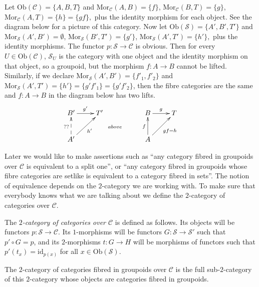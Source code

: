 \begin{example}
Let $ \text{Ob}(\mathcal{C}) = \{A,B,T\}$ and 
$\text{Mor}_\mathcal{C}(A,B) = \{f\}$, $\text{Mor}_\mathcal{C}(B,T) = \{g\}$,
$\text{Mor}_\mathcal{C}(A,T) = \{h\} = \{gf\},$ plus the identity morphism for 
each object. See the diagram below for a picture of this category. Now let 
$\text{Ob}(\mathcal{S}) = \{A',B',T'\}$ and 
$\text{Mor}_\mathcal{S}(A',B') = \emptyset$,  
$\text{Mor}_\mathcal{S}(B',T') = \{g'\}$,  
$\text{Mor}_\mathcal{S}(A',T') = \{h'\},$ plus the identity morphisms. The 
functor $p : \mathcal{S} \to \mathcal{C}$ is obvious. Then for every 
$U \in \text{Ob}(\mathcal{C})$, $\mathcal{S}_U$ is the category with one 
object and the identity morphism on that object, so a groupoid, but the 
morphism $f: A \to B$ cannot be lifted. Similarly, if we declare 
$\text{Mor}_\mathcal{S}(A',B') = \{f'_1, f'_2\}$ and 
$ \text{Mor}_\mathcal{S}(A',T') = \{h'\} = \{g'f'_1 \} = \{g'f'_2\}$, then 
the fibre categories are the same and $f: A \to B$ in the diagram below has 
two lifts. 
$$
\xymatrix{
B' \ar[r]^{g'} & T' &  & B \ar[r]^g & T & \\
A' \ar@{-->}[u]^{??} \ar[ru]_{h'} & & \ar@{}[u]^{above} &
A \ar[u]^f \ar[ru]_{gf = h} & \\
}
$$ 
\end{example}

\noindent
Later we would like to make assertions such as ``any category fibred in
groupoids over $\mathcal{C}$ is equivalent to a split one'', or
``any category fibred in groupoids whose fibre categories are setlike
is equivalent to a category fibred in sets''. The notion of equivalence
depends on the $2$-category we are working with. To make sure
that everybody knows what we are talking about we define the
$2$-category of categories over $\mathcal{C}$.

\begin{definition}
\label{definition-categories-over-C}
The {\it $2$-category of categories over $\mathcal{C}$} is defined
as follows. Its objects will be functors 
$p : \mathcal{S} \to \mathcal{C}$. Its 
$1$-morphisms will be functors $G : \mathcal{S} \to \mathcal{S}'$
such that $p' \circ G = p$, and its $2$-morphisms $t : G \to H$
will be morphisms of functors such that $p'(t_x) = \text{id}_{p(x)}$
for all $x \in \text{Ob}(\mathcal{S})$.
\end{definition}

\noindent
The $2$-category of categories fibred in groupoids over $\mathcal{C}$
is the full sub-$2$-category of this $2$-category whose objects
are categories fibred in groupoids.


